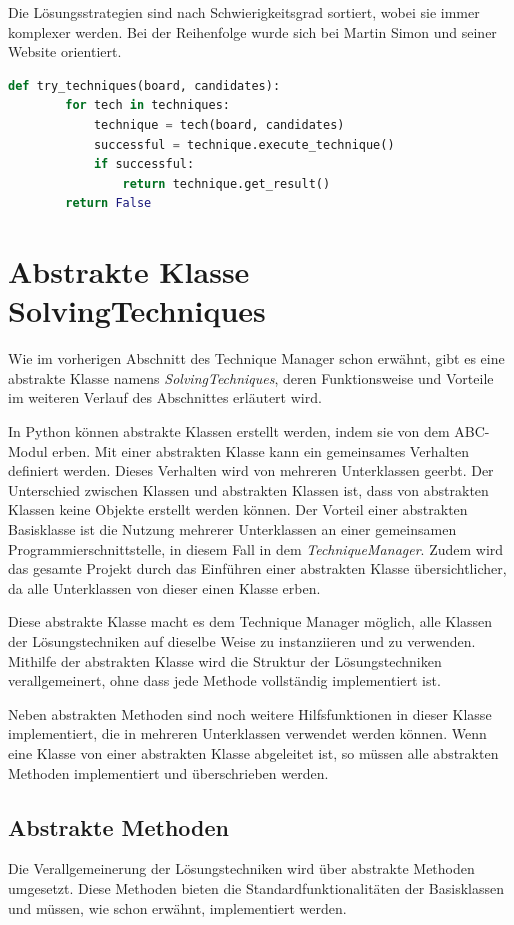 Die Lösungsstrategien sind nach Schwierigkeitsgrad sortiert, wobei sie immer komplexer werden. Bei der Reihenfolge wurde sich bei Martin Simon und seiner Website orientiert. \cite{martin}


\begin{lstlisting}[language=Python, caption={Finden einer anwendbaren Lösungstechnik}, label={lst:try}]
	def try_techniques(board, candidates):
		for tech in techniques:
			technique = tech(board, candidates)
			successful = technique.execute_technique()
			if successful:
				return technique.get_result()
		return False
\end{lstlisting}

\section{Abstrakte Klasse SolvingTechniques}

Wie im vorherigen Abschnitt des Technique Manager schon erwähnt, gibt es eine abstrakte Klasse namens \textit{SolvingTechniques}, deren Funktionsweise und Vorteile im weiteren Verlauf des Abschnittes erläutert wird. 

In Python können abstrakte Klassen erstellt werden, indem sie von dem ABC-Modul erben. Mit einer abstrakten Klasse kann ein gemeinsames Verhalten definiert werden. Dieses Verhalten wird von mehreren Unterklassen geerbt. Der Unterschied zwischen Klassen und abstrakten Klassen ist, dass von abstrakten Klassen keine Objekte erstellt werden können. Der Vorteil einer abstrakten Basisklasse ist die Nutzung mehrerer Unterklassen an einer gemeinsamen Programmierschnittstelle, in diesem Fall in dem \textit{TechniqueManager}. Zudem wird das gesamte Projekt durch das Einführen einer abstrakten Klasse übersichtlicher, da alle Unterklassen von dieser einen Klasse erben.

Diese abstrakte Klasse macht es dem Technique Manager möglich, alle Klassen der Lösungstechniken auf dieselbe Weise zu instanziieren und zu verwenden. Mithilfe der abstrakten Klasse wird die Struktur der Lösungstechniken verallgemeinert, ohne dass jede Methode vollständig implementiert ist. 

Neben abstrakten Methoden sind noch weitere Hilfsfunktionen in dieser Klasse implementiert, die in mehreren Unterklassen verwendet werden können. Wenn eine Klasse von einer abstrakten Klasse abgeleitet ist, so müssen alle abstrakten Methoden implementiert und überschrieben werden. 

\subsection{Abstrakte Methoden}
Die Verallgemeinerung der Lösungstechniken wird über abstrakte Methoden umgesetzt. Diese Methoden bieten die Standardfunktionalitäten der Basisklassen und müssen, wie schon erwähnt, implementiert werden.

